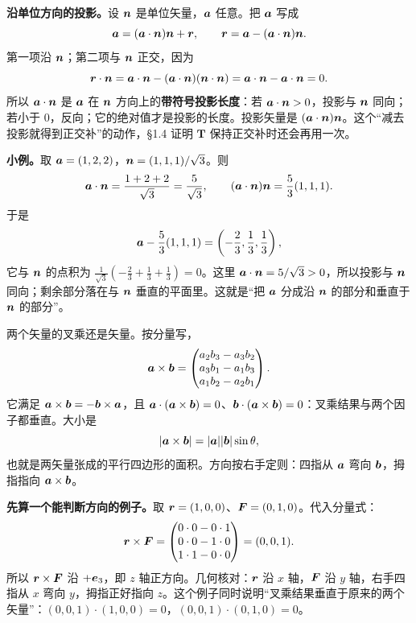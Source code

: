 \documentclass[11pt]{ctexart}
\newcommand{\ten}[1]{\mathbf{#1}}
\let\origsubhdr\subhdr
\renewcommand{\subhdr}[1]{\par\needspace{3\baselineskip}\origsubhdr{#1}}
\begin{document}
\textbf{沿单位方向的投影。}设 $\boldsymbol{n}$ 是单位矢量，$\boldsymbol{a}$ 任意。把 $\boldsymbol{a}$ 写成
\[
\boldsymbol{a}=(\boldsymbol{a}\cdot\boldsymbol{n})\boldsymbol{n}+\boldsymbol{r},
\qquad
\boldsymbol{r}=\boldsymbol{a}-(\boldsymbol{a}\cdot\boldsymbol{n})\boldsymbol{n} .
\]
第一项沿 $\boldsymbol{n}$；第二项与 $\boldsymbol{n}$ 正交，因为
\[
\boldsymbol{r}\cdot\boldsymbol{n}
=\boldsymbol{a}\cdot\boldsymbol{n}-(\boldsymbol{a}\cdot\boldsymbol{n})(\boldsymbol{n}\cdot\boldsymbol{n})
=\boldsymbol{a}\cdot\boldsymbol{n}-\boldsymbol{a}\cdot\boldsymbol{n}=0 .
\]
所以 $\boldsymbol{a}\cdot\boldsymbol{n}$ 是 $\boldsymbol{a}$ 在 $\boldsymbol{n}$ 方向上的\textbf{带符号投影长度}：若 $\boldsymbol{a}\cdot\boldsymbol{n}>0$，投影与 $\boldsymbol{n}$ 同向；若小于 $0$，反向；它的绝对值才是投影的长度。投影矢量是 $(\boldsymbol{a}\cdot\boldsymbol{n})\boldsymbol{n}$。这个“减去投影就得到正交补”的动作，\S1.4 证明 $\ten T$ 保持正交补时还会再用一次。

\textbf{小例。}取 $\boldsymbol{a}=(1,2,2)$，$\boldsymbol{n}=(1,1,1)/\sqrt3$。则
\[
\boldsymbol{a}\cdot\boldsymbol{n}=\frac{1+2+2}{\sqrt3}=\frac{5}{\sqrt3},
\qquad
(\boldsymbol{a}\cdot\boldsymbol{n})\boldsymbol{n}=\frac53(1,1,1).
\]
于是
\[
\boldsymbol{a}-\frac53(1,1,1)=\left(-\frac23,\frac13,\frac13\right),
\]
它与 $\boldsymbol{n}$ 的点积为 $\frac{1}{\sqrt3}(-\frac23+\frac13+\frac13)=0$。这里 $\boldsymbol{a}\cdot\boldsymbol{n}=5/\sqrt3>0$，所以投影与 $\boldsymbol{n}$ 同向；剩余部分落在与 $\boldsymbol{n}$ 垂直的平面里。这就是“把 $\boldsymbol{a}$ 分成沿 $\boldsymbol{n}$ 的部分和垂直于 $\boldsymbol{n}$ 的部分”。

\label{subsec:cross}

两个矢量的叉乘还是矢量。按分量写，
\[
\boldsymbol{a}\times\boldsymbol{b}=
\begin{pmatrix}
a_2b_3-a_3b_2\\
a_3b_1-a_1b_3\\
a_1b_2-a_2b_1
\end{pmatrix}.
\]
它满足 $\boldsymbol{a}\times\boldsymbol{b}=-\boldsymbol{b}\times\boldsymbol{a}$，且 $\boldsymbol{a}\cdot(\boldsymbol{a}\times\boldsymbol{b})=0$、$\boldsymbol{b}\cdot(\boldsymbol{a}\times\boldsymbol{b})=0$：叉乘结果与两个因子都垂直。大小是
\[
|\boldsymbol{a}\times\boldsymbol{b}|=|\boldsymbol{a}||\boldsymbol{b}|\sin\theta,
\]
也就是两矢量张成的平行四边形的面积。方向按右手定则：四指从 $\boldsymbol{a}$ 弯向 $\boldsymbol{b}$，拇指指向 $\boldsymbol{a}\times\boldsymbol{b}$。

\textbf{先算一个能判断方向的例子。}取 $\boldsymbol{r}=(1,0,0)$、$\boldsymbol{F}=(0,1,0)$。代入分量式：
\[
\boldsymbol{r}\times\boldsymbol{F}=
\begin{pmatrix}
0\cdot0-0\cdot1\\
0\cdot0-1\cdot0\\
1\cdot1-0\cdot0
\end{pmatrix}
=(0,0,1).
\]
所以 $\boldsymbol{r}\times\boldsymbol{F}$ 沿 $+\boldsymbol{e}_3$，即 $z$ 轴正方向。几何核对：$\boldsymbol{r}$ 沿 $x$ 轴，$\boldsymbol{F}$ 沿 $y$ 轴，右手四指从 $x$ 弯向 $y$，拇指正好指向 $z$。这个例子同时说明“叉乘结果垂直于原来的两个矢量”：$(0,0,1)\cdot(1,0,0)=0$，$(0,0,1)\cdot(0,1,0)=0$。
\end{document}
